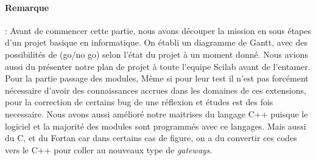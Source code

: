 \paragraph{Remarque} :
Avant de commencer cette partie, nous avons découper la mission en sous étapes d'un projet basique en
informatique. On établi un diagramme de Gantt, avec des possibilités de (go/no go) selon l'état du projet à
un moment donné. Nous avions aussi du présenter notre plan de projet à toute l'equipe Scilab avant de l'entamer. \newline
Pour la partie passage des modules, Même si pour leur test il n'est pas forcément nécessaire d'avoir
des connaissances accrues dans les domaines de ces extensions, pour la correction de certains
bug de une réflexion et études est des fois  necessaire.
Nous avons aussi amélioré notre maitrises du langage  C++ puisque le logiciel et la majorité des modules
sont programmés avec ce langages. Mais aussi du C, et du Fortan car dans certains cas de figure, on a du convertir ces codes
vers le C++ pour coller au nouveaux type de {\it gateways}.

